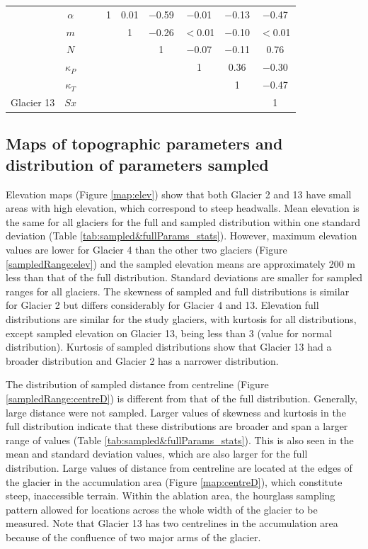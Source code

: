 \documentclass[12pt]{article}
\begin{document}
\begin{table}[H]
\begin{tabular}{cc|cccccccc}
 & $\alpha$ & & & 1 & 0.01 &  $-$0.59 &  $-$0.01 &  $-$0.13 &  $-$0.47 \\
 
 & $m$ & & & & 1 &  $-$0.26 & $<$0.01 &  $-$0.10 &  $<$0.01 \\
 
 & $N$ & & & & & 1 &  $-$0.07 &  $-$0.11 & 0.76 \\
 
 & $\kappa_P$ & & & & & & 1 & 0.36 &  $-$0.30 \\
 
 & $\kappa_T$ & & & & & & & 1 &  $-$0.47 \\
 
\multirow{-8}{*}{Glacier 13} & $Sx$ & & & & & & & & 1
\end{tabular}
\end{table}


\subsection{Maps of topographic parameters and distribution of parameters sampled}


Elevation maps (Figure \ref{map:elev}) show that both Glacier 2 and 13 have small areas with high elevation, which correspond to steep headwalls. Mean elevation is the same for all glaciers for the full and sampled distribution within one standard deviation (Table \ref{tab:sampled&fullParams_stats}). However, maximum elevation values are lower for Glacier 4 than the other two glaciers (Figure \ref{sampledRange:elev}) and the sampled elevation means are approximately 200 m less than that of the full distribution. Standard deviations are smaller for sampled ranges for all glaciers. The skewness of sampled and full distributions is similar for Glacier 2 but differs considerably for Glacier 4 and 13. Elevation full distributions are similar for the study glaciers, with kurtosis for all distributions, except sampled elevation on Glacier 13, being less than 3 (value for normal distribution). Kurtosis of sampled distributions show that Glacier 13 had a broader distribution and Glacier 2 has a narrower distribution. 

The distribution of sampled distance from centreline (Figure \ref{sampledRange:centreD}) is different from that of the full distribution. Generally, large distance were not sampled. Larger values of skewness and kurtosis in the full distribution indicate that these distributions are broader and span a larger range of values (Table \ref{tab:sampled&fullParams_stats}). This is also seen in the mean and standard deviation values, which are also larger for the full distribution. Large values of distance from centreline are located at the edges of the glacier in the accumulation area (Figure \ref{map:centreD}), which constitute steep, inaccessible terrain. Within the ablation area, the hourglass sampling pattern allowed for locations across the whole width of the glacier to be measured. Note that Glacier 13 has two centrelines in the accumulation area because of the confluence of two major arms of the glacier.
\end{document}
